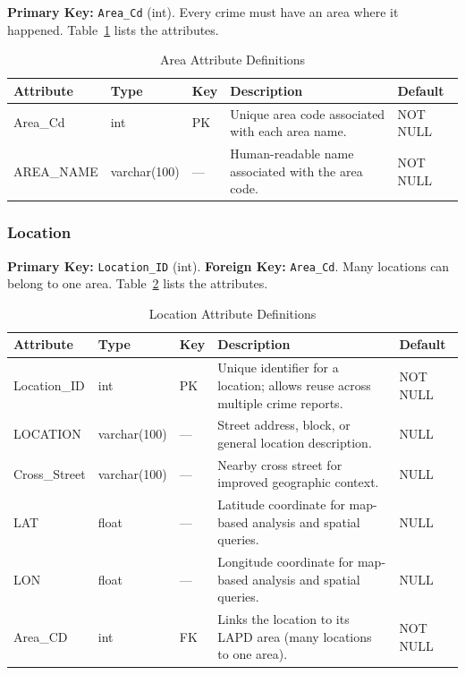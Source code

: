 \documentclass[conference]{IEEEtran}
\begin{document}
\textbf{Primary Key:} \texttt{Area\_Cd} (int). Every crime must have an area where it happened. Table~\ref{tab:area} lists the attributes.

\begin{table}[htbp]
\caption{Area Attribute Definitions}
\label{tab:area}
\begin{center}
\footnotesize
\begin{tabular}{|p{1.6cm}|p{1.3cm}|p{0.5cm}|p{3.2cm}|p{1.2cm}|}
\hline
\textbf{Attribute} & \textbf{Type} & \textbf{Key} & \textbf{Description} & \textbf{Default} \\
\hline
Area\_Cd & int & PK & Unique area code associated with each area name. & NOT NULL \\
\hline
AREA\_NAME & varchar(100) & --- & Human-readable name associated with the area code. & NOT NULL \\
\hline
\end{tabular}
\end{center}
\end{table}

\subsubsection{Location}

\textbf{Primary Key:} \texttt{Location\_ID} (int). \textbf{Foreign Key:} \texttt{Area\_Cd}. Many locations can belong to one area. Table~\ref{tab:location} lists the attributes.

\begin{table}[htbp]
\caption{Location Attribute Definitions}
\label{tab:location}
\begin{center}
\footnotesize
\begin{tabular}{|p{1.6cm}|p{1.3cm}|p{0.5cm}|p{3.2cm}|p{1.2cm}|}
\hline
\textbf{Attribute} & \textbf{Type} & \textbf{Key} & \textbf{Description} & \textbf{Default} \\
\hline
Location\_ID & int & PK & Unique identifier for a location; allows reuse across multiple crime reports. & NOT NULL \\
\hline
LOCATION & varchar(100) & --- & Street address, block, or general location description. & NULL \\
\hline
Cross\_Street & varchar(100) & --- & Nearby cross street for improved geographic context. & NULL \\
\hline
LAT & float & --- & Latitude coordinate for map-based analysis and spatial queries. & NULL \\
\hline
LON & float & --- & Longitude coordinate for map-based analysis and spatial queries. & NULL \\
\hline
Area\_CD & int & FK & Links the location to its LAPD area (many locations to one area). & NOT NULL \\
\hline
\end{tabular}
\end{center}
\end{table}
\end{document}
